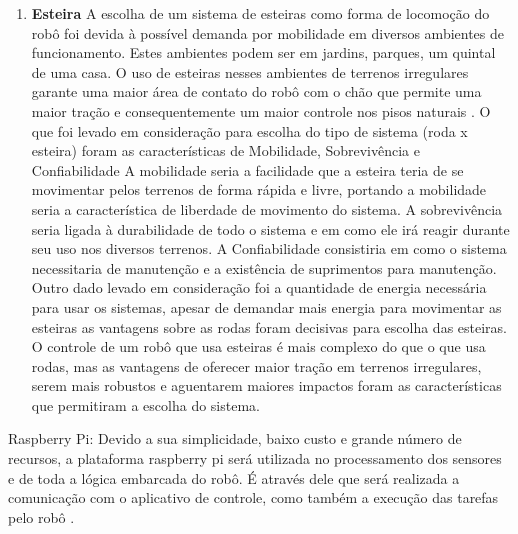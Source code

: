 \begin{enumerate}
  \item \textbf{Esteira}
A escolha de um sistema de esteiras como forma de locomoção do robô foi devida à possível demanda por mobilidade em diversos ambientes de funcionamento. Estes ambientes podem ser em jardins, parques, um quintal de uma casa.  
O uso de esteiras nesses ambientes de terrenos irregulares garante uma maior área de contato do robô com o chão que permite uma maior tração e consequentemente um maior controle nos pisos naturais \cite{bekker:1956}.
O que foi levado em consideração para escolha do tipo de sistema (roda x esteira) foram as características de Mobilidade, Sobrevivência e Confiabilidade \cite{hornback:1998} A mobilidade seria a facilidade que a esteira teria de se movimentar pelos terrenos de forma rápida e livre, portando a mobilidade seria a característica de liberdade de movimento do sistema. A sobrevivência seria ligada à durabilidade de todo o sistema e em como ele irá reagir durante seu uso nos diversos terrenos.  A Confiabilidade consistiria em como o sistema necessitaria de manutenção e a existência de suprimentos para manutenção. Outro dado levado em consideração foi a quantidade de energia necessária para usar os sistemas, apesar de demandar mais energia para movimentar as esteiras as vantagens sobre as rodas foram decisivas para escolha das esteiras.
O controle de um robô que usa esteiras é mais complexo do que o que usa rodas, mas as vantagens de oferecer maior tração em terrenos irregulares, serem mais robustos e aguentarem maiores impactos foram as características que permitiram a escolha do sistema.
\end{enumerate}

  Raspberry Pi: Devido a sua simplicidade, baixo custo e grande número de recursos, a plataforma raspberry pi será utilizada no processamento dos sensores e de toda a lógica embarcada do robô. É através dele que será realizada a comunicação com o aplicativo de controle, como também a execução das tarefas pelo robô \cite{jornalggn:2013}.

